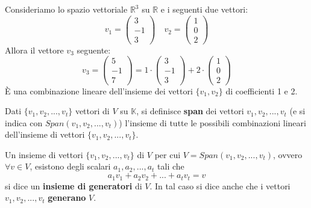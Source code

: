 \begin{example}
	Consideriamo lo spazio vettoriale $\mathbb{R}^3$ su $\mathbb{R}$ e i seguenti
	due vettori:
	\begin{equation*}
		v_1 = \begin{pmatrix}
			3 \\ -1 \\ 3
		\end{pmatrix}
		\quad
		v_2 = \begin{pmatrix}
			1 \\ 0 \\ 2
		\end{pmatrix}
	\end{equation*}
	Allora il vettore $v_3$ seguente:
	\begin{equation*}
		v_3 = \begin{pmatrix}
			5 \\ -1 \\ 7
		\end{pmatrix}
		= 1 \cdot \begin{pmatrix}
			3 \\ -1 \\ 3
		\end{pmatrix}
		+ 2 \cdot \begin{pmatrix}
			1 \\ 0 \\ 2
		\end{pmatrix}
	\end{equation*}
	\`E una combinazione lineare dell'insieme dei vettori $\{v_1, v_2\}$ di
	coefficienti 1 e 2.
\end{example}

\begin{definition}
	Dati $\{v_1, v_2, ..., v_t\}$ vettori di $V$ su $\mathbb{K}$,
	si definisce \textbf{span} dei vettori $v_1, v_2, ..., v_t$
	(e si indica con $Span(v_1, v_2, ..., v_t)$) l'insieme di tutte
	le possibili combinazioni lineari dell'insieme di vettori
	$\{v_1, v_2, ..., v_t\}$.
\end{definition}

\begin{definition}
	Un insieme di vettori $\{v_1, v_2, ..., v_t\}$ di $V$ per cui
	$V = Span(v_1, v_2, ..., v_t)$, ovvero $\forall v \in V$, esistono
	degli scalari $a_1, a_2, ..., a_t$ tali che
	\begin{equation*}
		a_1 v_1 + a_2 v_2 + ... + a_t v_t = v
	\end{equation*}
	si dice un \textbf{insieme di generatori} di $V$. In tal caso si dice
	anche che i vettori $v_1, v_2, ..., v_t$ \textbf{generano} $V$.
\end{definition}

